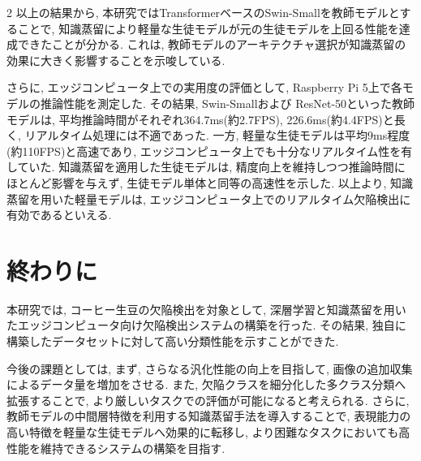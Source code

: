 \documentclass{jpreprint}
\begin{document}
\begin{multicols}{2}
以上の結果から, 本研究ではTransformerベースのSwin-Smallを教師モデルとすることで, 知識蒸留により軽量な生徒モデルが元の生徒モデルを上回る性能を達成できたことが分かる.  
これは, 教師モデルのアーキテクチャ選択が知識蒸留の効果に大きく影響することを示唆している.  

さらに, エッジコンピュータ上での実用度の評価として, Raspberry Pi 5上で各モデルの推論性能を測定した.  
その結果, Swin-Smallおよび ResNet-50といった教師モデルは, 平均推論時間がそれぞれ364.7ms(約2.7FPS), 226.6ms(約4.4FPS)と長く, リアルタイム処理には不適であった.  
一方, 軽量な生徒モデルは平均9ms程度(約110FPS)と高速であり, エッジコンピュータ上でも十分なリアルタイム性を有していた.  
知識蒸留を適用した生徒モデルは, 精度向上を維持しつつ推論時間にほとんど影響を与えず, 生徒モデル単体と同等の高速性を示した.  
以上より, 知識蒸留を用いた軽量モデルは, エッジコンピュータ上でのリアルタイム欠陥検出に有効であるといえる.  

\section{終わりに}
本研究では, コーヒー生豆の欠陥検出を対象として, 深層学習と知識蒸留を用いたエッジコンピュータ向け欠陥検出システムの構築を行った. 
その結果, 独自に構築したデータセットに対して高い分類性能を示すことができた.

今後の課題としては, まず, さらなる汎化性能の向上を目指して, 画像の追加収集によるデータ量を増加をさせる. 
また, 欠陥クラスを細分化した多クラス分類へ拡張することで, より厳しいタスクでの評価が可能になると考えられる. 
さらに, 教師モデルの中間層特徴を利用する知識蒸留手法を導入することで, 表現能力の高い特徴を軽量な生徒モデルへ効果的に転移し, より困難なタスクにおいても高性能を維持できるシステムの構築を目指す.

{\small

}

\end{multicols}
\end{document}
